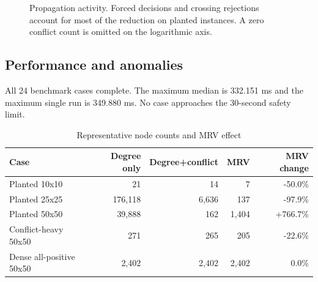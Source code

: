 \documentclass[11pt,a4paper,oneside]{article}
\begin{document}
\begin{figure}[H]
\centering
{}
\caption{Propagation activity. Forced decisions and crossing rejections account
for most of the reduction on planted instances. A zero conflict count is omitted
on the logarithmic axis.}
\label{fig:propagation}
\end{figure}

\subsection{Performance and anomalies}

All 24 benchmark cases complete. The maximum median is 332.151 ms and the maximum
single run is 349.880 ms. No case approaches the 30-second safety limit.

\begin{table}[H]
\centering
\caption{Representative node counts and MRV effect}
\begin{tabular}{lrrrr}
\toprule
Case & Degree only & Degree+conflict & MRV & MRV change \\
\midrule
Planted 10x10 & 21 & 14 & 7 & -50.0\% \\
Planted 25x25 & 176,118 & 6,636 & 137 & -97.9\% \\
Planted 50x50 & 39,888 & 162 & 1,404 & +766.7\% \\
Conflict-heavy 50x50 & 271 & 265 & 205 & -22.6\% \\
Dense all-positive 50x50 & 2,402 & 2,402 & 2,402 & 0.0\% \\
\bottomrule
\end{tabular}
\end{table}
\end{document}
